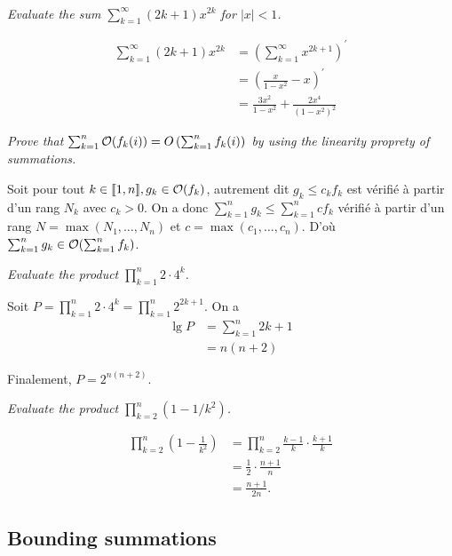 \begin{description}
\begin{ex}
\begin{align*}
     \end{align*}
   \end{ex}
 \item[A.1-5 $\star$] {\itshape Evaluate the sum $\sum_{k=1}^\infty(2k+1)x^{2k}$ for $|x| < 1$.}
   \begin{ex}
    \begin{align*}
      \sum_{k=1}^{\infty}(2k+1)x^{2k} &= \left(\sum_{k=1}^\infty x^{2k+1}\right)^\prime\\
    &= \left(\frac{x}{1-x^2} - x\right)^\prime\\
      &= \frac{3x^2}{1-x^2} + \frac{2x^4}{(1-x^2)^2}
    \end{align*}
  \end{ex}
   {\itshape  Prove that $\sum_{k=1}^n\mathcal{O}(f_k(i)) = O\left(\sum_{k=1}^n f_k(i)\right)$ by using the linearity proprety of summations.}
    \begin{ex}
    Soit pour tout $k \in \llbracket 1, n \rrbracket, g_k \in \mathcal{O}(f_k)$, autrement dit $g_k \le c_kf_k$ est v\'erifi\'e \`a partir d'un rang $N_k$ avec $c_k > 0$. On a donc $\sum_{k=1}^n g_k \le \sum_{k=1}^ncf_k$ v\'erifi\'e \`a partir d'un rang $N = \max(N_1, \ldots,N_n)$ et $c = \max(c_1, \ldots,c_n)$. D'o\`u $\sum_{k=1}^n g_k \in \mathcal{O}(\sum_{k=1}^n f_k)$.
  \end{ex}
 {\itshape Evaluate the product $\prod_{k=1}^n2\cdot 4^k$.}
    \begin{ex}
  Soit $P=\prod_{k=1}^n2\cdot4^k = \prod_{k=1}^n2^{2k+1}$. On a 
  \begin{align*}
    \lg P &= \sum_{k=1}^n2k+1\\
    &= n(n+2)
  \end{align*}

  Finalement, $P = 2^{n(n+2)}$.
    \end{ex}
  \item[A.1-8 $\star$] {\itshape Evaluate the product $\prod_{k=2}^n(1-1/k^2)$.}
    \begin{ex}
  \begin{align*}
    \prod_{k=2}^n(1-\frac{1}{k^2}) &= \prod_{k=2}^n \frac{k-1}{k}\cdot\frac{k+1}{k}\\
      &= \frac{1}{2}\cdot\frac{n+1}{n}\\
      &= \frac{n+1}{2n}.
  \end{align*}
    \end{ex}
\end{description}

  \subsection{Bounding summations}

